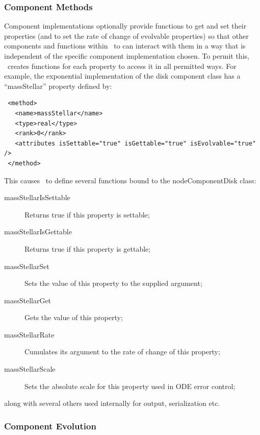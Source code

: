 \subsubsection{Component Methods}\label{sec:ComponentMethods}

Component implementations optionally provide functions to get and set their properties (and to set the rate of change of evolvable properties) so that other components and functions within \glc\ to can interact with them in a way that is independent of the specific component implementation chosen. To permit this, \glc\ creates functions for each property to access it in all permitted ways. For example, the {\normalfont \ttfamily exponential} implementation of the {\normalfont \ttfamily disk} component class has a ``{\normalfont \ttfamily massStellar}'' property defined by:
\begin{verbatim}
 <method>
   <name>massStellar</name>
   <type>real</type>
   <rank>0</rank>
   <attributes isSettable="true" isGettable="true" isEvolvable="true" />
 </method>
\end{verbatim}
This causes \glc\ to define several functions bound to the {\normalfont \ttfamily nodeComponentDisk} class:
\begin{description}
\item [{\normalfont \ttfamily massStellarIsSettable}] Returns {\normalfont \ttfamily true} if this property is settable;
\item [{\normalfont \ttfamily massStellarIsGettable}] Returns {\normalfont \ttfamily true} if this property is gettable;
\item [{\normalfont \ttfamily massStellarSet}] Sets the value of this property to the supplied argument;
\item [{\normalfont \ttfamily massStellarGet}] Gets the value of this property;
\item [{\normalfont \ttfamily massStellarRate}] Cumulates its argument to the rate of change of this property;
\item [{\normalfont \ttfamily massStellarScale}] Sets the absolute scale for this property used in ODE error control;
\end{description}
along with several others used internally for output, serialization etc.

\subsubsection{Component Evolution}\label{sec:ComponentEvolution}

